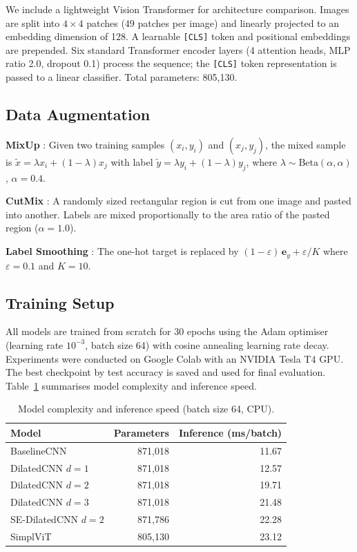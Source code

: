\documentclass[10pt,a4paper]{article}
\begin{document}
We include a lightweight Vision Transformer for architecture comparison.
Images are split into $4\!\times\!4$ patches (49 patches per image) and linearly projected to an embedding dimension of 128.
A learnable \texttt{[CLS]} token and positional embeddings are prepended.
Six standard Transformer encoder layers (4 attention heads, MLP ratio 2.0, dropout 0.1) process the sequence; the \texttt{[CLS]} token representation is passed to a linear classifier.
Total parameters: 805{,}130.

\subsection{Data Augmentation}

\textbf{MixUp} \cite{mixup}: Given two training samples $(x_i, y_i)$ and $(x_j, y_j)$, the mixed sample is $\tilde{x} = \lambda x_i + (1-\lambda) x_j$ with label $\tilde{y} = \lambda y_i + (1-\lambda) y_j$, where $\lambda \sim \text{Beta}(\alpha, \alpha)$, $\alpha = 0.4$.

\textbf{CutMix} \cite{cutmix}: A randomly sized rectangular region is cut from one image and pasted into another. Labels are mixed proportionally to the area ratio of the pasted region ($\alpha = 1.0$).

\textbf{Label Smoothing} \cite{labelsmoothing}: The one-hot target is replaced by $(1-\varepsilon)\,\mathbf{e}_y + \varepsilon/K$ where $\varepsilon = 0.1$ and $K=10$.

\subsection{Training Setup}

All models are trained from scratch for 30 epochs using the Adam optimiser (learning rate $10^{-3}$, batch size 64) with cosine annealing learning rate decay.
Experiments were conducted on Google Colab with an NVIDIA Tesla T4 GPU.
The best checkpoint by test accuracy is saved and used for final evaluation.
Table~\ref{tab:complexity} summarises model complexity and inference speed.

\begin{table}[H]
  \centering
  \caption{Model complexity and inference speed (batch size 64, CPU).}
  \label{tab:complexity}
  \begin{tabular}{lrr}
    \toprule
    \textbf{Model} & \textbf{Parameters} & \textbf{Inference (ms/batch)} \\
    \midrule
    BaselineCNN        & 871,018 & 11.67 \\
    DilatedCNN $d=1$   & 871,018 & 12.57 \\
    DilatedCNN $d=2$   & 871,018 & 19.71 \\
    DilatedCNN $d=3$   & 871,018 & 21.48 \\
    SE-DilatedCNN $d=2$& 871,786 & 22.28 \\
    SimplViT           & 805,130 & 23.12 \\
    \bottomrule
  \end{tabular}
\end{table}
\end{document}
